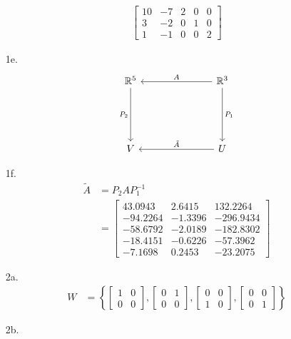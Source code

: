 \documentclass[12pt,fleqn,leqno,letterpaper]{article}
\begin{document}
\begin{enumerate}
\begin{align*}
\begin{bmatrix}
						10 & -7 & 2 & 0 & 0\\
						3 & -2 & 0 & 1 & 0\\
						1 & -1 & 0 & 0 & 2
						\end{bmatrix}
				\end{align*}
			\item[1e.]
				\[\begin{tikzcd}[sep=large]
					{\mathbb{R}^{5}} && {\mathbb{R}^3} \\
					\\
					V && U
					\arrow["A"', from=1-3, to=1-1]
					\arrow["{\tilde{A}}"', from=3-3, to=3-1]
					\arrow["{P_1}", from=1-3, to=3-3]
					\arrow["{P_2}"', from=1-1, to=3-1]
				\end{tikzcd}\]
			\item[1f.]
					\begin{align*}
						\tilde{A} &= P_{2} A P_{1}^{-1}\\
						&= \begin{bmatrix}
							   43.0943 &  2.6415 &  132.2264\\
								-94.2264 & -1.3396 & -296.9434\\
								-58.6792 & -2.0189 & -182.8302\\
								-18.4151 & -0.6226 &  -57.3962\\
								-7.1698  & 0.2453  & -23.2075
	  						\end{bmatrix}
					\end{align*}
			\newpage
			\item[2a.]
				\begin{align*}
					W &= \left\{
						\begin{bmatrix} 1 & 0 \\ 0 & 0 \end{bmatrix},
						\begin{bmatrix} 0 & 1 \\ 0 & 0 \end{bmatrix},
						\begin{bmatrix} 0 & 0 \\ 1 & 0 \end{bmatrix},
						\begin{bmatrix} 0 & 0 \\ 0 & 1 \end{bmatrix}
					\right\}
				\end{align*}
			\item[2b.]

\end{enumerate}
\end{document}
